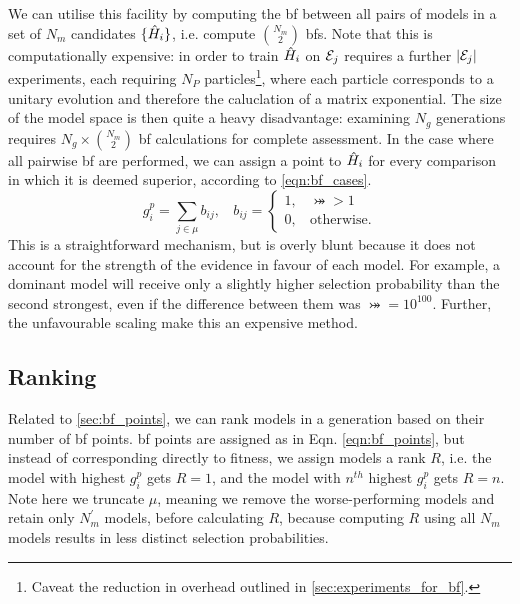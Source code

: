 We can utilise this facility by computing the \gls{bf} between all 
    pairs of models in a set of $N_m$ candidates $\{\hat{H}_i\}$, 
    i.e. compute ${N_m \choose 2}$ \gls{bf}s. 
Note that this is computationally expensive: 
    in order to train $\hat{H}_i$ on ${ \mathcal{E} }_j$ requires a further $\lvert { \mathcal{E} }_j \rvert$ \glspl{experiment}, 
    each requiring $N_P$ \glspl{particle}\footnote{Caveat the reduction in overhead outlined in \cref{sec:experiments_for_bf}.}, 
    where each \gls{particle} corresponds to a unitary evolution and therefore the caluclation of a matrix exponential. 
The size of the \gls{model space} is then quite a heavy disadvantage: 
    examining $N_g$ generations requires $N_g \times {N_m \choose 2}$ \gls{bf} calculations for complete assessment. 
In the case where all pairwise \gls{bf} are performed, 
    we can assign a point to $\hat{H}_i$ for every comparison in which it is deemed superior, according to \cref{eqn:bf_cases}.
\begin{equation}
    \label{eqn:bf_points}
    g_i^p = \sum_{j \in \mu} b_{ij}, \ \ \ \ b_{ij} = 
        \begin{cases}
            1, \ \ \ \ \bij > 1 \\
            0, \ \ \ \ \text{otherwise}.
        \end{cases}
\end{equation}
This is a straightforward mechanism, but is overly blunt
    because it does not account for the strength of the evidence
    in favour of each model. 
For example, a dominant model will receive only a slightly higher selection probability 
    than the second strongest, even if the difference between them was $\bij = 10^{100}$. 
Further, the unfavourable scaling make this an expensive method. 

\subsection{Ranking}\label{sec:bf_ranking}
Related to \cref{sec:bf_points}, we can rank models in a generation based on their number of \gls{bf} points.
\gls{bf} points are assigned as in Eqn. \ref{eqn:bf_points}, 
    but instead of corresponding directly to fitness, 
    we assign models a rank $R$, 
    i.e. the model with highest $g_i^p$ gets $R=1$, 
    and the model with $n^{th}$ highest $g_i^p$ gets $R=n$. 
Note here we truncate $\mu$, meaning we remove the worse-performing models and retain only $N_m^{\prime}$ models, 
    before calculating $R$, because computing $R$ using all $N_m$ models results in less distinct selection probabilities. 

